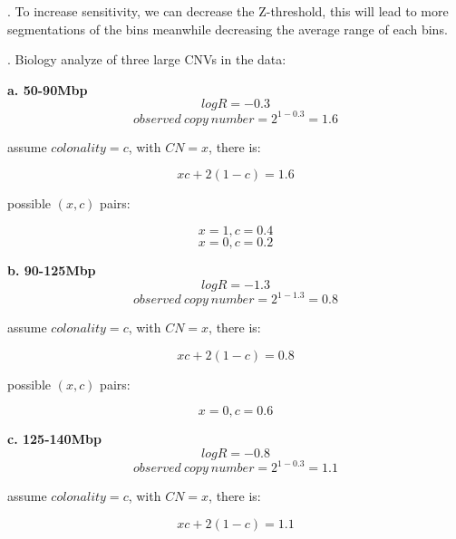 \documentclass[a4paper]{article}
\begin{document}
. To increase sensitivity, we can decrease the Z-threshold, this will lead to more segmentations of the bins meanwhile decreasing the average range of each bins. 

. Biology analyze of three large CNVs in the data:

\textbf{a. 50-90Mbp}
\begin{equation*}
logR = -0.3 
\end{equation*}
\begin{equation*}
observed\ copy\ number  = 2^{1-0.3}=1.6
\end{equation*}

assume $colonality = c$, with $CN = x$, there is:

\begin{equation*}
xc+2(1-c) = 1.6
\end{equation*}

possible $(x,c)$ pairs:

\begin{equation*}
x = 1, c = 0.4
\end{equation*}
\begin{equation*}
x = 0, c = 0.2
\end{equation*}

\textbf{b. 90-125Mbp}
\begin{equation*}
logR = -1.3 
\end{equation*}
\begin{equation*}
observed\ copy\ number  = 2^{1-1.3}=0.8
\end{equation*}

assume $colonality = c$, with $CN = x$, there is:

\begin{equation*}
xc+2(1-c) = 0.8
\end{equation*}

possible $(x,c)$ pairs:

\begin{equation*}
x = 0, c = 0.6
\end{equation*}

\textbf{c. 125-140Mbp}
\begin{equation*}
logR = -0.8
\end{equation*}
\begin{equation*}
observed\ copy\ number  = 2^{1-0.3}=1.1
\end{equation*}

assume $colonality = c$, with $CN = x$, there is:

\begin{equation*}
xc+2(1-c) = 1.1
\end{equation*}
\end{document}
